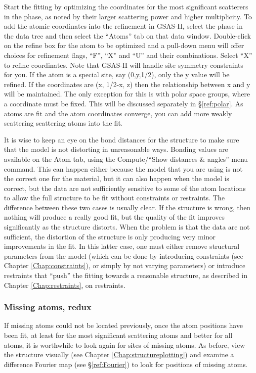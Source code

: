 Start the fitting by optimizing the coordinates for the most significant scatterers in the phase, as noted by their larger scattering power and higher multiplicity. 
To add the atomic coordinates into the refinement in GSAS-II, select the phase in the data tree and then select the ``Atoms'' tab on that data window. 
Double-click on the refine box for the atom to be optimized and a pull-down menu will offer choices for refinement flags, ``F'', ``X'' and ``U'' and their combinations. 
Select ``X'' to refine coordinates. Note that GSAS-II will handle site symmetry constraints for you. If the atom is a special site, say (0,y,1/2), only the y value will be refined. If the coordinates are (x, 1/2-x, z) then the relationship between x and y will be maintained. 
The only exception for this is with polar space groups, where a coordinate must be fixed. This will be discussed separately in \S\ref{ref:polar}. As atoms are fit and the atom coordinates converge, you can add more weakly scattering scattering atoms into the fit. 

It is wise to keep an eye on the bond distances for the structure to make sure that the model is not distorting in unreasonable ways. Bonding values are available on the Atom tab, using the Compute/``Show distances \& angles'' menu command. This can happen either because the model that you are using is not the correct one for the material, but it can also happen when the model is correct, but the data are not sufficiently sensitive to some of the atom locations to allow the full structure to be fit without constraints or restraints. The difference between these two cases is usually clear. If the structure is wrong, then nothing will produce a really good fit, but the quality of the fit improves significantly as the structure distorts. When the problem is that the data are not sufficient, the distortion of the structure is only producing very minor improvements in the fit. In this latter case, one must either remove structural parameters from the model (which can be done by introducing constraints (see Chapter \ref{Chap:constraints}), or simply by not varying parameters) or introduce restraints that ``push'' the fitting towards a reasonable structure, as described in Chapter \ref{Chap:restraints}, on restraints. 

\subsubsection{Missing atoms, redux}
If missing atoms could not be located previously, once the atom positions have been fit, at least for the most significant scattering atoms and better for all atoms, it is worthwhile to look again for sites of missing atoms. As before, view the structure visually (see Chapter \ref{Chap:structureplotting}) and examine a difference Fourier map (see \S\ref{ref:Fourier}) to look for positions of missing atoms. 

